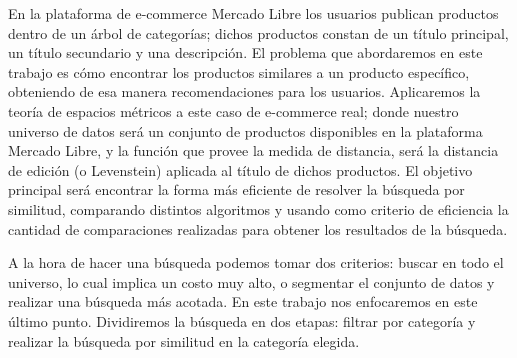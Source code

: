 En la plataforma de e-commerce Mercado Libre los usuarios publican productos dentro de un \'arbol de categor\'ias; dichos productos constan de un t\'itulo principal, un t\'itulo secundario y una descripci\'on.
El problema que abordaremos en este trabajo es c\'omo encontrar los productos similares a un producto espec\'ifico, obteniendo de esa manera recomendaciones para los usuarios. Aplicaremos la teor\'ia de espacios m\'etricos a este caso de e-commerce real; donde nuestro universo de datos ser\'a un conjunto de productos disponibles en la plataforma Mercado Libre, y la funci\'on que provee la medida de distancia, ser\'a la distancia de edici\'on (o Levenstein) aplicada al t\'itulo de dichos productos.
El objetivo principal ser\'a encontrar la forma m\'as eficiente de resolver la b\'usqueda por similitud, comparando distintos algoritmos y usando como criterio de eficiencia la cantidad de comparaciones realizadas para obtener los resultados de la b\'usqueda.

A la hora de hacer una b\'usqueda podemos tomar dos criterios: buscar en todo el universo, lo cual implica un costo muy alto, o segmentar el conjunto de datos y realizar una b\'usqueda m\'as acotada. En este trabajo nos enfocaremos en este \'ultimo punto.
Dividiremos la b\'usqueda en dos etapas: filtrar por categor\'ia y realizar la b\'usqueda por similitud en la categor\'ia elegida.

